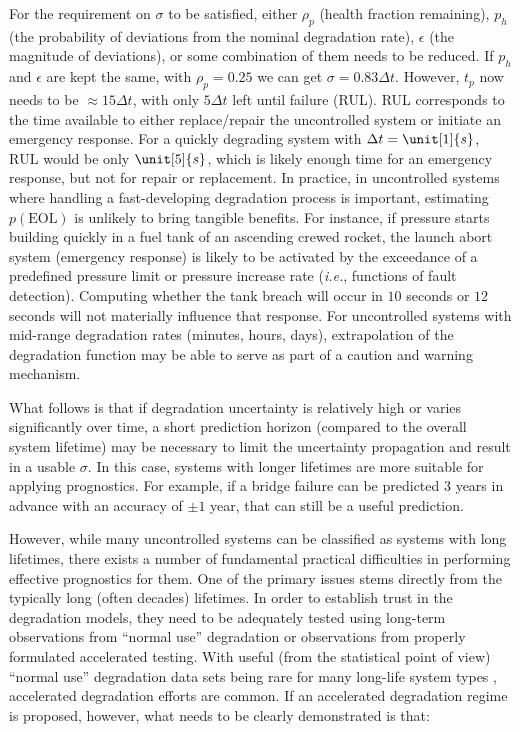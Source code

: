 For the requirement on $\sigma$ to be satisfied, either $\rho_p$ (health fraction remaining), $p_h$ (the probability of deviations from the nominal degradation rate), $\epsilon$ (the magnitude of deviations), or some combination of them needs to be reduced. If $p_h$ and $\epsilon$ are kept the same, with $\rho_p = 0.25$ we can get $\sigma  = 0.83\Delta t$. However, $t_p$ now needs to be $\approx 15 \Delta t$, with only $5 \Delta t$ left until failure (RUL). RUL corresponds to the time available to either replace/repair the uncontrolled system or initiate an emergency response. For a quickly degrading system with $\Delta t = \unit[1]{s}$, $\text{RUL}$ would be only $\unit[5]{s}$, which is likely enough time for an emergency response, but not for repair or replacement. In practice, in uncontrolled systems where handling a fast-developing degradation process is important, estimating $p(\text{EOL})$ is unlikely to bring tangible benefits. For instance, if pressure starts building quickly in a fuel tank of an ascending crewed rocket, the launch abort system (emergency response) is likely to be activated by the exceedance of a predefined pressure limit or pressure increase rate (\textit{i.e.}, functions of fault detection). Computing whether the tank breach will occur in $10$ seconds or $12$ seconds will not materially influence that response. For uncontrolled systems with mid-range degradation rates (minutes, hours, days), extrapolation of the degradation function may be able to serve as part of a caution and warning mechanism.

What follows is that if degradation uncertainty is relatively high or varies significantly over time, a short prediction horizon (compared to the overall system lifetime) may be necessary to limit the uncertainty propagation and result in a usable $\sigma$. In this case, systems with longer lifetimes are more suitable for applying prognostics. For example, if a bridge failure can be predicted $3$ years in advance with an accuracy of $\pm 1$ year, that can still be a useful prediction.

However, while many uncontrolled systems can be classified as systems with long lifetimes, there exists a number of fundamental practical difficulties in performing effective prognostics for them. One of the primary issues stems directly from the typically long (often decades) lifetimes. In order to establish trust in the degradation models, they need to be adequately tested using long-term observations from ``normal use'' degradation or observations from properly formulated accelerated testing. With useful (from the statistical point of view) ``normal use'' degradation data sets being rare for many long-life system types \cite{Heng2009}, accelerated degradation efforts are common. If an accelerated degradation regime is proposed, however, what needs to be clearly demonstrated is that:

